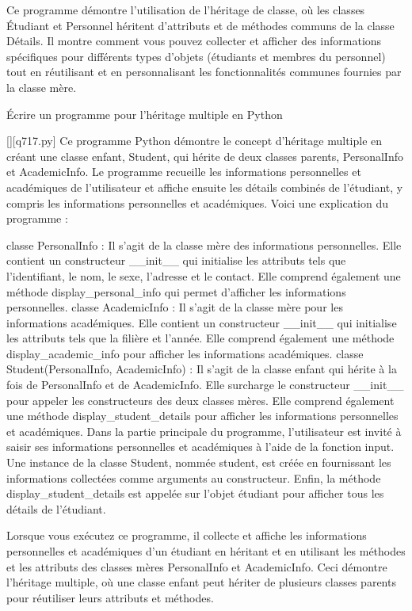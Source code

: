 \begin{solution}
Ce programme démontre l'utilisation de l'héritage de classe, où les classes Étudiant et Personnel héritent d'attributs et de méthodes communs de la classe Détails. Il montre comment vous pouvez collecter et afficher des informations spécifiques pour différents types d'objets (étudiants et membres du personnel) tout en réutilisant et en personnalisant les fonctionnalités communes fournies par la classe mère.
        \end{solution}
        

        \question
        Écrire un programme pour l'héritage multiple en Python
        \par
        \begin{solution}
            \renewcommand{\nomfichier}{q717.py}
            \pythonfile{\chemincode \nomfichier}[][\nomfichier]
            Ce programme Python démontre le concept d'héritage multiple en créant une classe enfant, Student, qui hérite de deux classes parents, PersonalInfo et AcademicInfo. Le programme recueille les informations personnelles et académiques de l'utilisateur et affiche ensuite les détails combinés de l'étudiant, y compris les informations personnelles et académiques. Voici une explication du programme :

    classe PersonalInfo : Il s'agit de la classe mère des informations personnelles. Elle contient un constructeur \_\_init\_\_ qui initialise les attributs tels que l'identifiant, le nom, le sexe, l'adresse et le contact. Elle comprend également une méthode display\_personal\_info qui permet d'afficher les informations personnelles.
    classe AcademicInfo : Il s'agit de la classe mère pour les informations académiques. Elle contient un constructeur \_\_init\_\_ qui initialise les attributs tels que la filière et l'année. Elle comprend également une méthode display\_academic\_info pour afficher les informations académiques.
    classe Student(PersonalInfo, AcademicInfo) : Il s'agit de la classe enfant qui hérite à la fois de PersonalInfo et de AcademicInfo. Elle surcharge le constructeur \_\_init\_\_ pour appeler les constructeurs des deux classes mères. Elle comprend également une méthode display\_student\_details pour afficher les informations personnelles et académiques.
    Dans la partie principale du programme, l'utilisateur est invité à saisir ses informations personnelles et académiques à l'aide de la fonction input.
    Une instance de la classe Student, nommée student, est créée en fournissant les informations collectées comme arguments au constructeur.
    Enfin, la méthode display\_student\_details est appelée sur l'objet étudiant pour afficher tous les détails de l'étudiant.

Lorsque vous exécutez ce programme, il collecte et affiche les informations personnelles et académiques d'un étudiant en héritant et en utilisant les méthodes et les attributs des classes mères PersonalInfo et AcademicInfo. Ceci démontre l'héritage multiple, où une classe enfant peut hériter de plusieurs classes parents pour réutiliser leurs attributs et méthodes.
        \end{solution}
        

